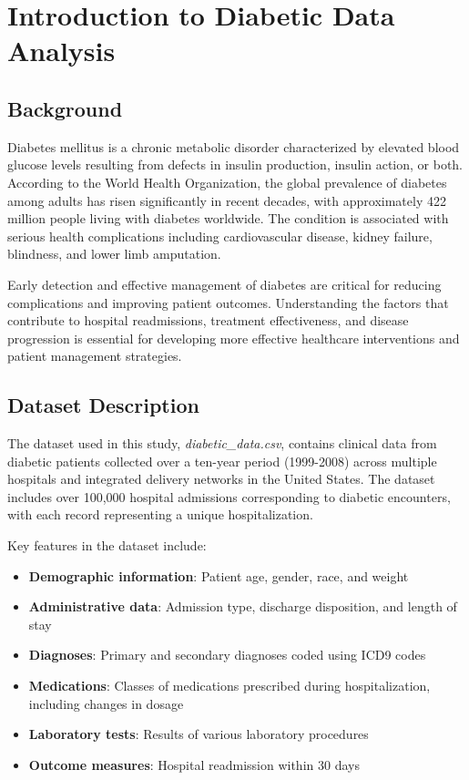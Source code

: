 \chapter{Introduction to Diabetic Data Analysis}

\section{Background}
Diabetes mellitus is a chronic metabolic disorder characterized by elevated blood glucose levels resulting from defects in insulin production, insulin action, or both. According to the World Health Organization, the global prevalence of diabetes among adults has risen significantly in recent decades, with approximately 422 million people living with diabetes worldwide. The condition is associated with serious health complications including cardiovascular disease, kidney failure, blindness, and lower limb amputation.

Early detection and effective management of diabetes are critical for reducing complications and improving patient outcomes. Understanding the factors that contribute to hospital readmissions, treatment effectiveness, and disease progression is essential for developing more effective healthcare interventions and patient management strategies.

\section{Dataset Description}
The dataset used in this study, \textit{diabetic\_data.csv}, contains clinical data from diabetic patients collected over a ten-year period (1999-2008) across multiple hospitals and integrated delivery networks in the United States. The dataset includes over 100,000 hospital admissions corresponding to diabetic encounters, with each record representing a unique hospitalization.

Key features in the dataset include:
\begin{itemize}
    \item \textbf{Demographic information}: Patient age, gender, race, and weight
    \item \textbf{Administrative data}: Admission type, discharge disposition, and length of stay
    \item \textbf{Diagnoses}: Primary and secondary diagnoses coded using ICD9 codes
    \item \textbf{Medications}: Classes of medications prescribed during hospitalization, including changes in dosage
    \item \textbf{Laboratory tests}: Results of various laboratory procedures
    \item \textbf{Outcome measures}: Hospital readmission within 30 days
\end{itemize}

